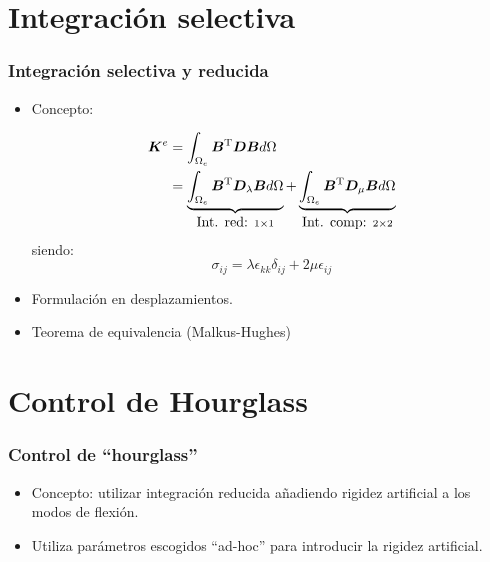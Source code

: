 \documentclass[handout]{beamer}
\begin{document}
\section{Integración selectiva}
\begin{frame}
\frametitle{Integración selectiva y reducida}
\begin{itemize}
\item Concepto:

\begin{align*}
\bm{K}^{e}&=\int_{\Omega_{e}} \bm{B}^{\rm T} \bm{D} \bm{B} d \Omega \\
\mbox{}   &=
\underbrace{\int_{\Omega_{e}} \bm{B}^{\rm T} \bm{D}_{\lambda} \bm{B} d \Omega}_{\mbox{Int. red: } 1\times 1}
+
\underbrace{\int_{\Omega_{e}} \bm{B}^{\rm T} \bm{D}_{\mu} \bm{B} d \Omega}_{\mbox{Int. comp: } 2\times 2}
\end{align*}
siendo:
$$\sigma_{ij}=\lambda \epsilon_{kk} \delta_{ij}+
2 \mu \epsilon_{ij}$$

\item Formulación en desplazamientos.

\item Teorema de equivalencia (Malkus-Hughes)
\end{itemize}
\end{frame}
\section{Control de Hourglass}
\begin{frame}
\frametitle{Control de ``hourglass''}
\begin{itemize}
\item Concepto: utilizar integración reducida añadiendo rigidez artificial a
los modos de flexión.
\item Utiliza parámetros escogidos 
``ad-hoc'' para introducir la rigidez artificial.
\end{itemize}
\end{frame}
\end{document}

